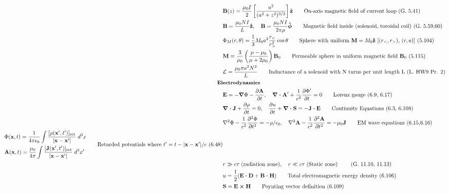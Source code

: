 \documentclass[10pt]{article}
\newcommand{\zhat}{\boldsymbol{\hat{\textbf{z}}}}
\newcommand{\phihat}{\boldsymbol{\hat{\textbf{$\phi$}}}}
\newcommand{\ve}[1]{\boldsymbol{\mathbf{#1}}}
\newcommand{\vect}[1]{\boldsymbol{\mathbf{#1}}}
\newcommand{\eo}{\epsilon_0}
\newcommand{\pder}[2]{\frac{\partial #1}{\partial #2}}
\newcommand{\dpder}[2]{\frac{\partial^2 #1}{\partial #2^2}}
\newcommand{\K}{\frac{1}{4 \pi \eo}}
\newcommand{\lrb}[1]{\left[ #1 \right]}
\begin{document}
\begin{multicols}{2}
\begin{align*}
		& \ve{B}(z) = \frac{\mu_0 I}{2} \lrb{ \frac{a^2}{(a^2 + z^2)^{3/2}} }\zhat \tag*{On-axis magnetic field of current loop (G. 5.41)} \\
		& \ve{B} = \frac{\mu_0 N I}{L} \zhat, \quad \ve{B} = \frac{\mu_0 N I}{2 \pi \rho} \phihat \tag*{Magnetic field inside (solenoid, toroidal coil) (G. 5.59,60)} \\
		& \Phi_M(r,\theta) = \frac{1}{3} M_0 a^2 \frac{r_<}{r_>^2} \cos \theta \tag*{Sphere with uniform $\ve{M} = M_0 \zhat$ [$(r_<,r_>)$, $(r,a)$] (5.104)} \\
		& \vect{M} = \frac{3}{\mu_0} \left( \frac{\mu - \mu_0}{\mu + 2 \mu_0} \right) \vect{B}_0 \tag*{Permeable sphere in uniform magnetic field $\ve{B}_0$ (5.115)} \\
		& \mathcal{L} = \frac{\mu_0 \pi a^2 N^2}{L} \tag*{Inductance of a solenoid with N turns per unit length L (L. HW9 Pr. 2)} \\	
	& \small \hspace{-10pt} \textbf{Electrodynamics} \small \\
		& \ve{E} = -\ve{\nabla} \Phi - \pder{\ve{A}}{t}, \quad \ve{\nabla \cdot A}' + \frac{1}{c^2} \pder{\Phi'}{t} = 0 \tag*{Lorenz gauge (6.9, 6.17)} \\
		& \ve{\nabla \cdot J} + \pder{\rho}{t} = 0, \quad \pder{u}{t} + \ve{\nabla \cdot S} = - \ve{J \cdot E} \tag*{Continuity Equations (6.3, 6.108)} \\
		& \nabla^2 \Phi - \frac{1}{c^2} \dpder{\Phi}{t} = -\rho / \eo, \quad \nabla^2 \ve{A} - \frac{1}{c^2} \dpder{\ve{A}}{t} = -\mu_0 \ve{J} \tag*{EM wave equations (6.15,6.16)} \\
		\begin{split}
			& \Phi(\ve{x},t) = \K \int \frac{[\rho(\ve{x}',t')]_\text{ret}}{|\ve{x} - \ve{x}'|} \; d^3 x \\
			& \ve{A}(\ve{x},t) = \frac{\mu_0}{4 \pi} \int \frac{[\ve{J}(\ve{x}',t')]_\text{ret}}{|\ve{x} - \ve{x}'|} \; d^3 x' \\
		\end{split} \tag*{Retarded potentials where $t' = t - |\ve{x} - \ve{x}'| / c$ (6.48)} \\
		& r \gg c \tau \; \text{(radiation zone)}, \quad r \ll c \tau \; \text{(Static zone)} \tag*{ (G. 11.10, 11.13)} \\
		& u = \frac{1}{2}(\ve{E \cdot D} + \ve{B \cdot H}) \tag*{Total electromagnetic energy density (6.106)} \\
		& \ve{S} = \ve{E \times H} \tag*{Poynting vector definition (6.109)} \\

\end{align*}
\end{multicols}
\end{document}
